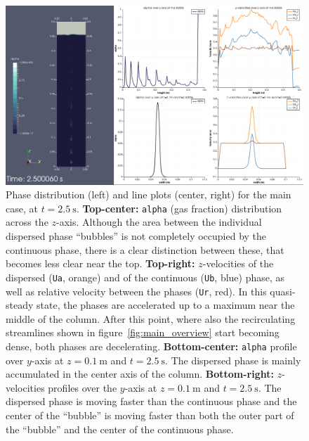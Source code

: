 \documentclass[11pt, a4paper, twoside]{article}
\begin{document}
\begin{figure}
    \centering
    \includegraphics[width=\textwidth]{figures/main/plots}
    \caption{Phase distribution (left) and line plots (center, right) for the main case, at $t=\SI{2.5}{\second}$. \textbf{Top-center:} \texttt{alpha} (gas fraction) distribution across the $z$-axis. Although the area between the individual dispersed phase ``bubbles'' is not completely occupied by the continuous phase, there is a clear distinction between these, that becomes less clear near the top. \textbf{Top-right:} $z$-velocities of the dispersed (\texttt{Ua}, orange) and of the continuous (\texttt{Ub}, blue) phase, as well as relative velocity between the phases (\texttt{Ur}, red). In this quasi-steady state, the phases are accelerated up to a maximum near the middle of the column. After this point, where also the recirculating streamlines shown in figure~\ref{fig:main_overview} start becoming dense, both phases are decelerating. \textbf{Bottom-center:} \texttt{alpha} profile over $y$-axis at $z=\SI{0.1}{\metre}$ and $t=\SI{2.5}{\second}$. The dispersed phase is mainly accumulated in the center axis of the column. \textbf{Bottom-right:} $z$-velocities profiles over the $y$-axis at $z=\SI{0.1}{\metre}$ and $t=\SI{2.5}{\second}$. The dispersed phase is moving faster than the continuous phase and the center of the ``bubble'' is moving faster than both the outer part of the ``bubble'' and the center of the continuous phase.}
    \label{fig:main_plots}
\end{figure}
\end{document}
